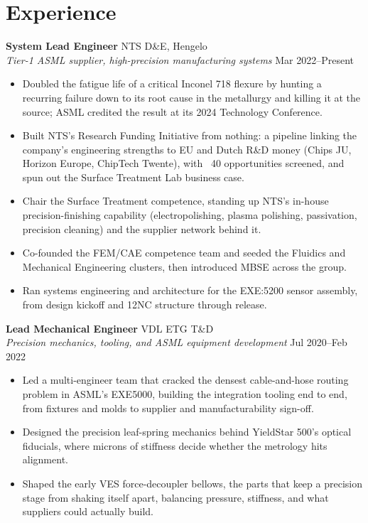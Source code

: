 \documentclass[10pt,a4paper]{article}
\begin{document}
\section{Experience}

\textbf{System Lead Engineer} \hfill NTS D\&E, Hengelo \\
{\small\textit{Tier-1 ASML supplier, high-precision manufacturing systems}} \hfill {\small Mar 2022--Present}
\begin{itemize}
  \item Doubled the fatigue life of a critical Inconel 718 flexure by hunting a recurring failure down to its root cause in the metallurgy and killing it at the source; ASML credited the result at its 2024 Technology Conference.
  \item Built NTS's Research Funding Initiative from nothing: a pipeline linking the company's engineering strengths to EU and Dutch R\&D money (Chips JU, Horizon Europe, ChipTech Twente), with ~40 opportunities screened, and spun out the Surface Treatment Lab business case.
  \item Chair the Surface Treatment competence, standing up NTS's in-house precision-finishing capability (electropolishing, plasma polishing, passivation, precision cleaning) and the supplier network behind it.
  \item Co-founded the FEM/CAE competence team and seeded the Fluidics and Mechanical Engineering clusters, then introduced MBSE across the group.
  \item Ran systems engineering and architecture for the EXE:5200 sensor assembly, from design kickoff and 12NC structure through release.
\end{itemize}

\vspace{4pt}
\textbf{Lead Mechanical Engineer} \hfill VDL ETG T\&D \\
{\small\textit{Precision mechanics, tooling, and ASML equipment development}} \hfill {\small Jul 2020--Feb 2022}
\begin{itemize}
  \item Led a multi-engineer team that cracked the densest cable-and-hose routing problem in ASML's EXE5000, building the integration tooling end to end, from fixtures and molds to supplier and manufacturability sign-off.
  \item Designed the precision leaf-spring mechanics behind YieldStar 500's optical fiducials, where microns of stiffness decide whether the metrology hits alignment.
  \item Shaped the early VES force-decoupler bellows, the parts that keep a precision stage from shaking itself apart, balancing pressure, stiffness, and what suppliers could actually build.
\end{itemize}
\end{document}
